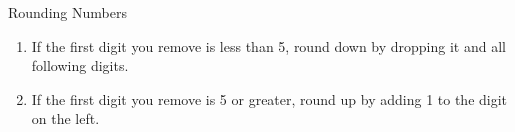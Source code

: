 \documentclass[notes=hide]{beamer}
\begin{document}
\begin{frame}{Rounding Numbers}
	\begin{enumerate}
		\item<1-> If the first digit you remove is less than 5, round
			down by dropping it and all following digits.
		\item<2-> If the first digit you remove is 5 or greater, round
			up by adding 1 to the digit on the left.
	\end{enumerate}

\end{frame}

\end{document}
